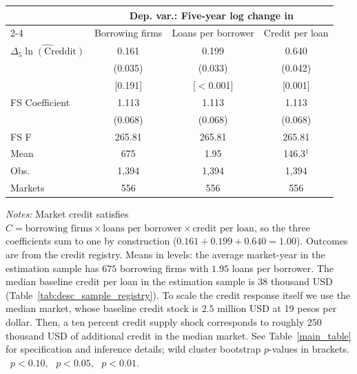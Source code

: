 \begin{threeparttable}
    \begin{tabular}{lccc}
        \toprule
        & \multicolumn{3}{c}{\textbf{Dep. var.}: Five-year log change in} \\
        \cmidrule(lr){2-4}
        & Borrowing firms & Loans per borrower & Credit per loan \\
        \midrule
        $\widehat{\Delta_5\ln(\text{Creddit})}$
        & 0.161\sym{***} & 0.199\sym{***} & 0.640\sym{***} \\
        & (0.035) & (0.033) & (0.042) \\
        & [0.191] & [$<$0.001] & [0.001] \\
        \midrule
        FS Coefficient & 1.113 & 1.113 & 1.113 \\
                       & (0.068) & (0.068) & (0.068) \\
        FS F & 265.81 & 265.81 & 265.81 \\
        Mean & 675 & 1.95 & 146.3$^{\dagger}$ \\
        Obs. & 1{,}394 & 1{,}394 & 1{,}394 \\
        Markets & 556 & 556 & 556 \\
        \bottomrule
    \end{tabular}
    \begin{tablenotes}[flushleft]
        \footnotesize
        \item \textit{Notes:} Market credit satisfies $C = \text{borrowing firms} \times \text{loans per borrower} \times \text{credit per loan}$, so the three coefficients sum to one by construction ($0.161 + 0.199 + 0.640 = 1.00$). Outcomes are from the credit registry. Means in levels: the average market-year in the estimation sample has $675$ borrowing firms with $1.95$ loans per borrower. The median baseline credit per loan in the estimation sample is $38$ thousand USD (Table~\ref{tab:desc_sample_registry}). To scale the credit response itself we use the median market, whose baseline credit stock is $2.5$ million USD at 19 pesos per dollar. Then, a ten percent credit supply shock corresponds to roughly $250$ thousand USD of additional credit in the median market. See Table~\ref{main_table} for specification and inference details; wild cluster bootstrap $p$-values in brackets. \sym{*}~$p<0.10$, \sym{**}~$p<0.05$, \sym{***}~$p<0.01$.
    \end{tablenotes}
\end{threeparttable}